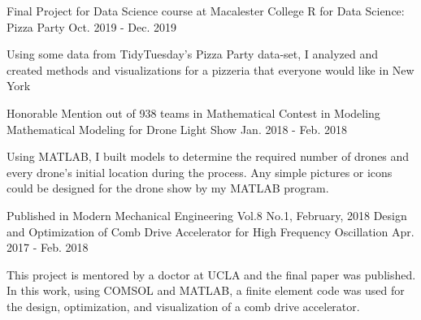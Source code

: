 

\begin{cventries}
  \cventry
    {Final Project for Data Science course at Macalester College} %
    {R for Data Science: Pizza Party} %
    {} %
    {Oct. 2019 - Dec. 2019} %
    {
      \begin{cvitems} %
        \item {Using some data from TidyTuesday’s Pizza Party data-set, I analyzed and created methods and visualizations for a pizzeria that everyone would like in New York}
      \end{cvitems}
    }

  \cventry
    {Honorable Mention out of 938 teams in Mathematical Contest in Modeling} %
    {Mathematical Modeling for Drone Light Show} %
    {} %
    {Jan. 2018 - Feb. 2018} %
    {
      \begin{cvitems} %
        \item {Using MATLAB, I built models to determine the required number of drones and every drone’s initial location during the process. Any simple pictures or icons could be designed for the drone show by my MATLAB program.}
      \end{cvitems}
    }


  \cventry
    {Published in Modern Mechanical Engineering Vol.8 No.1, February, 2018} %
    {Design and Optimization of Comb Drive Accelerator for High Frequency Oscillation} %
    {} %
    {Apr. 2017 - Feb. 2018} %
    {
      \begin{cvitems} %
        \item {This project is mentored by a doctor at UCLA and the final paper was published. In this work, using COMSOL and MATLAB, a finite element code was used for the design, optimization, and visualization of a comb drive accelerator.}
      \end{cvitems}
    }
    

\end{cventries}
